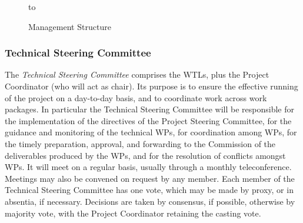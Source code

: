 \documentclass[a4paper,11pt]{article}
\begin{document}
\begin{figure}[ht!]
\vspace{-0.75in}
\begin{center}
\centerline{\hspace{1in} \hbox to }
\end{center}
\vspace{-1.8in}
\caption{Management Structure}
\label{fig:management}
\end{figure}



\subsubsection*{Technical Steering Committee}
\vspace{-6pt}

The \emph{Technical Steering Committee} comprises the WTLs, plus the
Project Coordinator (who will act as chair).  Its purpose is to ensure
the effective running of the project on a day-to-day basis, and to
coordinate work across work packages.  In particular the Technical Steering
Committee will be
responsible for the implementation of the directives of the Project Steering
Committee, for the
guidance and monitoring of the technical WPs, for coordination among
WPs, for  the timely preparation, approval, and forwarding to the Commission
of the deliverables produced by the WPs, and for the resolution of conflicts
amongst WPs.  It will meet on a regular basis, usually through a monthly
teleconference.  Meetings may also be convened on request by any member.
Each member of the Technical Steering Committee has one vote,
which may be made by proxy, or in absentia, if necessary.  
Decisions are taken by consensus, if possible, otherwise by majority vote, 
with the
Project Coordinator retaining the casting vote.
\end{document}
